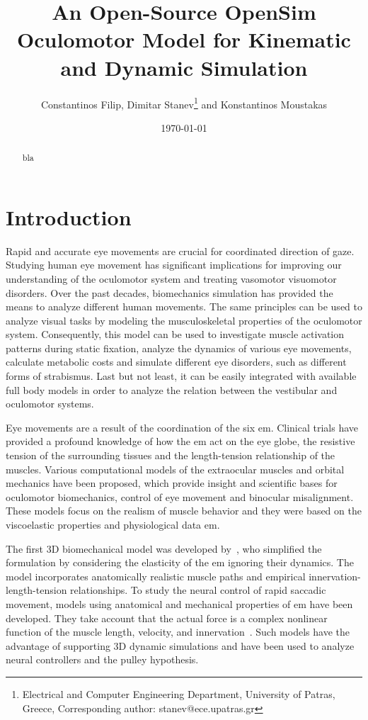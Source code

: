 \documentclass[11pt,a4paper,draft=false]{report}
\title{An Open-Source OpenSim Oculomotor Model for Kinematic and Dynamic
  Simulation}
\author{Constantinos Filip, Dimitar Stanev\footnote{Electrical and Computer
    Engineering Department, University of Patras, Greece, Corresponding author:
    stanev@ece.upatras.gr} and Konstantinos Moustakas}
\date{\today}
\begin{document}

\maketitle

\begin{abstract}
  bla
\end{abstract}

\section*{Introduction}\label{sec:introduction}

Rapid and accurate eye movements are crucial for coordinated direction of
gaze. Studying human eye movement has significant implications for improving our
understanding of the oculomotor system and treating vasomotor visuomotor disorders. Over
the past decades, biomechanics simulation has provided the means to analyze
different human movements. The same principles can be used to analyze visual
tasks by modeling the musculoskeletal properties of the oculomotor
system. Consequently, this model can be used to investigate muscle activation
patterns during static fixation, analyze the dynamics of various eye movements,
calculate metabolic costs and simulate different eye disorders, such as
different forms of strabismus. Last but not least, it can be easily integrated
with available full body models in order to analyze the relation between the
vestibular and oculomotor systems.

Eye movements are a result of the coordination of the six \gls{em}. Clinical
trials have provided a profound knowledge of how the \gls{em} act on the eye
globe, the resistive tension of the surrounding tissues and the length-tension
relationship of the muscles. Various computational models of the extraocular
muscles and orbital mechanics have been proposed, which provide insight and
scientific bases for oculomotor biomechanics, control of eye movement and
binocular misalignment. These models focus on the realism of muscle behavior and
they were based on the viscoelastic properties and physiological data \gls{em}.

The first 3D biomechanical model was developed by~\cite{Robinson1964a,
  Robinson1969}, who simplified the formulation by considering the elasticity of
the \gls{em} ignoring their dynamics. The model incorporates anatomically
realistic muscle paths and empirical innervation-length-tension
relationships. To study the neural control of rapid saccadic movement, models
using anatomical and mechanical properties of \gls{em} have been developed. They
take account that the actual force is a complex nonlinear function of the muscle
length, velocity, and innervation~\cite{Thelen2003, Millard2013}. Such models
have the advantage of supporting 3D dynamic simulations and have been used to
analyze neural controllers and the pulley hypothesis.
\end{document}
